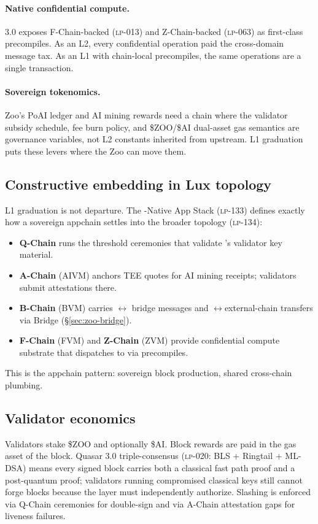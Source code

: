 \paragraph{Native confidential compute.} \Zoo{} 3.0 exposes
F-Chain-backed \FHE{} (\textsc{lp-013}) and Z-Chain-backed \ZKP{}
(\textsc{lp-063}) as first-class precompiles. As an L2, every confidential
operation paid the cross-domain message tax. As an L1 with chain-local
precompiles, the same operations are a single transaction.

\paragraph{Sovereign tokenomics.} Zoo's PoAI ledger and AI mining rewards
need a chain where the validator subsidy schedule, fee burn policy, and
\$ZOO/\$AI dual-asset gas semantics are governance variables, not L2
constants inherited from upstream. L1 graduation puts these levers where
the Zoo \DAO{} can move them.

\subsection{Constructive embedding in Lux topology}

L1 graduation is not departure. The \Quasar{}-Native App Stack
(\textsc{lp-133}) defines exactly how a sovereign appchain settles into the
broader \Lux{} topology (\textsc{lp-134}):

\begin{itemize}[leftmargin=1.2em]
  \item \textbf{Q-Chain} runs the \Ringtail{} threshold ceremonies that
        validate \Zoo{}'s validator key material.
  \item \textbf{A-Chain} (AIVM) anchors TEE quotes for AI mining receipts;
        \Zoo{} validators submit attestations there.
  \item \textbf{B-Chain} (BVM) carries \Zoo{}$\leftrightarrow$\Lux{} bridge
        messages and \Zoo{}$\leftrightarrow$external-chain transfers via
        \Zoo{} Bridge (\S\ref{sec:zoo-bridge}).
  \item \textbf{F-Chain} (FVM) and \textbf{Z-Chain} (ZVM) provide
        confidential compute substrate that \Zoo{} dispatches to via
        precompiles.
\end{itemize}

This is the appchain pattern: sovereign block production, shared cross-chain
plumbing.

\subsection{Validator economics}

Validators stake \$ZOO and optionally \$AI. Block rewards are paid in the
gas asset of the block. Quasar 3.0 triple-consensus
(\textsc{lp-020}: BLS + Ringtail + ML-DSA) means every signed block carries
both a classical fast path proof and a post-quantum proof; validators
running compromised classical keys still cannot forge blocks because the
\Ringtail{} layer must independently authorize. Slashing is enforced via
Q-Chain ceremonies for double-sign and via A-Chain attestation gaps for
liveness failures.
